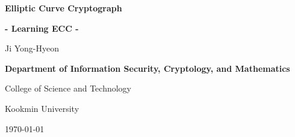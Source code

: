 \documentclass[12pt,openany]{book}
\theoremstyle{definition}
\begin{document}
	
	\begin{titlepage}
		\begin{center}
			{\Huge\textsf{\textbf{Elliptic Curve Cryptograph}}\par}
			{\Large\textsf{\textbf{- Learning ECC -}}\par}
			\vspace{0.5in}
			{\Large {Ji Yong-Hyeon}\par}
			\vspace{1in}
			\vspace{1in}
			{\large\bf \textsf{Department of Information Security, Cryptology, and Mathematics}\par}
			{\textsf{College of Science and Technology}\par}
			{\textsf{Kookmin University}\par}
			\vspace{.25in}
			{\large \textsf{\today}\par}
		\end{center}
	\end{titlepage}
	
	\frontmatter
	
%	
	
	\newpage
	\tableofcontents
	
	\newpage
	\mainmatter
	
	
	
	\appendix
	
%	
	
	\backmatter
	
\end{document}
